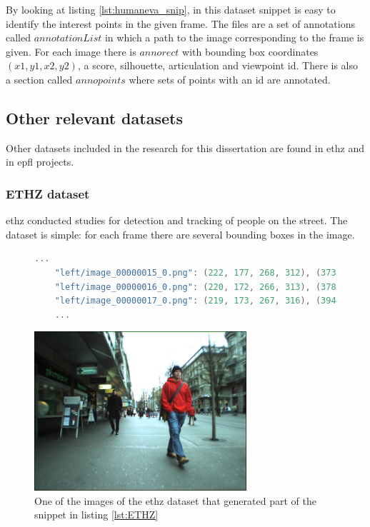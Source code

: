 By looking at listing \ref{lst:humaneva_snip}, in this dataset snippet is easy to identify the interest points in the given frame. The files are a set of annotations called $annotationList$ in which a path to the image corresponding to the frame is given. For each image there is $annorect$ with bounding box coordinates $(x1,y1,x2,y2)$, a score, silhouette, articulation and viewpoint id. There is also a section called $annopoints$ where sets of points with an id are annotated.

\subsection{Other relevant datasets}
Other datasets included in the research for this dissertation are found in \gls{ethz} and in \gls{epfl} projects. 
\subsubsection{ETHZ dataset}
\gls{ethz} conducted studies for detection and tracking of people on the street. The dataset is simple: for each frame there are several bounding boxes in the image.
\begin{figure}
\begin{center}
	\begin{lstlisting}[label={lst:ETHZ}, caption={ETHZ dataset dataset file snippet.},language=c++]
	...
	"left/image_00000015_0.png": (222, 177, 268, 312), (373, 105, 463, 393), (458, 220, 487, 285), (310, 225, 327, 265), (335, 228, 352, 264), (267, 228, 281, 261);
	"left/image_00000016_0.png": (220, 172, 266, 313), (378, 407, 476, 102), (462, 219, 486, 285), (312, 223, 327, 264), (337, 226, 352, 262), (267, 231, 279, 260);
	"left/image_00000017_0.png": (219, 173, 267, 316), (394, 94, 489, 423), (313, 222, 330, 262), (338, 227, 354, 262), (267, 228, 279, 260);
	...	\end{lstlisting}
\end{center}
\end{figure}

\begin{figure}[htp]
	
	\centering
	\includegraphics[width=0.7\textwidth]{capstate/imgs/image_00000016_0.png}
	
	\caption{One of the images of the \gls{ethz} dataset that generated part of the snippet in listing \ref{lst:ETHZ} }
	\label{fig:ETHZ}
	
\end{figure}

